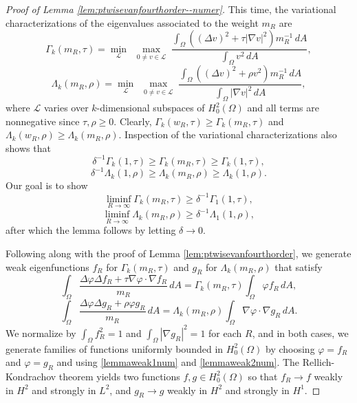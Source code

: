 \documentclass[11pt]{amsart}
\theoremstyle{definition}
\numberwithin{equation}{section}
\newcommand{\lapl}{\Delta}
\newcommand{\grad}{\nabla}
\begin{document}
\begin{proof}[Proof of Lemma \ref{lem:ptwisevanfourthorder--numer}] This time, the variational characterizations of the eigenvalues associated to the weight $m_R$ are
$$
\Gamma_k(m_R, \tau)
= \min_{\mathcal L}\ \max_{\substack{0\neq v\in\mathcal L}}
\frac{\displaystyle \int_{\Omega}\left((\Delta v)^2 + \tau |\nabla v|^2\right)m_R^{-1}\,dA}{\displaystyle \int_{\Omega} v^2\,dA},
$$
$$
\Lambda_k(m_R, \rho)
= \min_{\mathcal L}\ \max_{\substack{0\neq v\in\mathcal L}}
\frac{\displaystyle \int_{\Omega}\left((\Delta v)^2 + \rho v^2\right)m_R^{-1}\,dA}{\displaystyle \int_{\Omega} |\nabla v|^2\,dA},
$$
where $\mathcal{L}$ varies over $k$-dimensional subspaces of $H_0^2(\Omega)$ and all terms are nonnegative since $\tau, \rho \geq 0$. Clearly, $\Gamma_k(w_R,\tau) \geq \Gamma_k(m_R,\tau)$ and $\Lambda_k(w_R,\rho) \geq \Lambda_k(m_R,\rho)$.  Inspection of the variational characterizations also shows that
\begin{equation}\label{lemmaweak1num}
\delta^{-1}\Gamma_k(1, \tau) \geq \Gamma_k(m_R, \tau) \geq \Gamma_k(1, \tau),
\end{equation}
\begin{equation}\label{lemmaweak2num}
\delta^{-1}\Lambda_k(1, \rho) \geq \Lambda_k(m_R, \rho) \geq \Lambda_k(1, \rho).
\end{equation}
Our goal is to show
\begin{equation}\label{eq:weakgoalexpl1}
\liminf_{R \to \infty} \Gamma_k(m_R,\tau)\geq \delta^{-1}\Gamma_1(1,\tau),
\end{equation}
\begin{equation}\label{eq:weakgoalexpl2}
\liminf_{R \to \infty} \Lambda_k(m_R,\rho)\geq \delta^{-1}\Lambda_1(1,\rho),
\end{equation}
after which the lemma follows by letting $\delta \to 0$.

Following along with the proof of Lemma \ref{lem:ptwisevanfourthorder}, we generate weak eigenfunctions $f_R$ for $\Gamma_k(m_R, \tau)$ and $g_R$ for $\Lambda_k(m_R,\rho)$ that satisfy
$$
\int_\Omega \frac{\lapl \varphi \lapl f_R + \tau \grad \varphi \cdot \grad f_R}{m_R}\, dA
= \Gamma_k(m_R, \tau) \int_\Omega \varphi f_R \, dA,
$$
$$
\int_\Omega \frac{\lapl \varphi \lapl g_R + \rho \varphi g_R}{m_R}\, dA
= \Lambda_k(m_R, \rho) \int_\Omega \grad \varphi \cdot \grad g_R \, dA.
$$
We normalize by $\int_\Omega f_R^2 = 1$ and $\int_\Omega |\grad g_R|^2 = 1$ for each $R$, and in both cases, we generate families of functions uniformly bounded in $H_0^2(\Omega)$ by choosing $\varphi = f_R$ and $\varphi = g_R$ and using \eqref{lemmaweak1num} and \eqref{lemmaweak2num}. The Rellich-Kondrachov theorem yields two functions $f,g \in H_0^2(\Omega)$ so that $f_R \to f$ weakly in $H^2$ and strongly in $L^2$, and $g_R \to g$ weakly in $H^2$ and strongly in $H^1$.


\end{proof}
\end{document}

